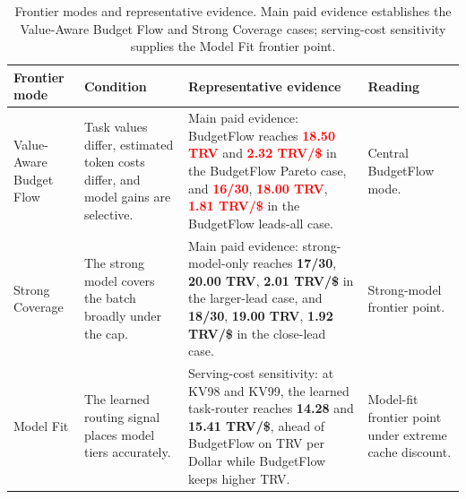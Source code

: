\documentclass{article}
\newcommand{\method}{BudgetFlow\xspace}
\newcommand{\trv}{TRV\xspace}
\newcommand{\pos}[1]{\textcolor{red}{\textbf{#1}}}
\newcommand{\ctrl}[1]{\textcolor{bfblue}{\textbf{#1}}}
\begin{document}
\begin{table}[t]
\centering
\footnotesize
\begin{tabular}{@{}p{}p{}p{}p{}@{}}
\toprule
Frontier mode & Condition & Representative evidence & Reading \\
\midrule
Value-Aware Budget Flow & Task values differ, estimated token costs differ, and model gains are selective. & Main paid evidence: \method reaches \pos{18.50 \trv} and \pos{2.32 \trv/\$} in the BudgetFlow Pareto case, and \pos{16/30}, \pos{18.00 \trv}, \pos{1.81 \trv/\$} in the BudgetFlow leads-all case. & Central \method mode. \\
Strong Coverage & The strong model covers the batch broadly under the cap. & Main paid evidence: strong-model-only reaches \ctrl{17/30}, \ctrl{20.00 \trv}, \ctrl{2.01 \trv/\$} in the larger-lead case, and \ctrl{18/30}, \ctrl{19.00 \trv}, \ctrl{1.92 \trv/\$} in the close-lead case. & Strong-model frontier point. \\
Model Fit & The learned routing signal places model tiers accurately. & Serving-cost sensitivity: at KV98 and KV99, the learned task-router reaches \ctrl{14.28} and \ctrl{15.41 \trv/\$}, ahead of \method on \trv per Dollar while \method keeps higher \trv. & Model-fit frontier point under extreme cache discount. \\
\bottomrule
\end{tabular}
\caption{Frontier modes and representative evidence. Main paid evidence establishes the Value-Aware Budget Flow and Strong Coverage cases; serving-cost sensitivity supplies the Model Fit frontier point.}
\label{tab:frontier-modes}
\end{table}
\end{document}
